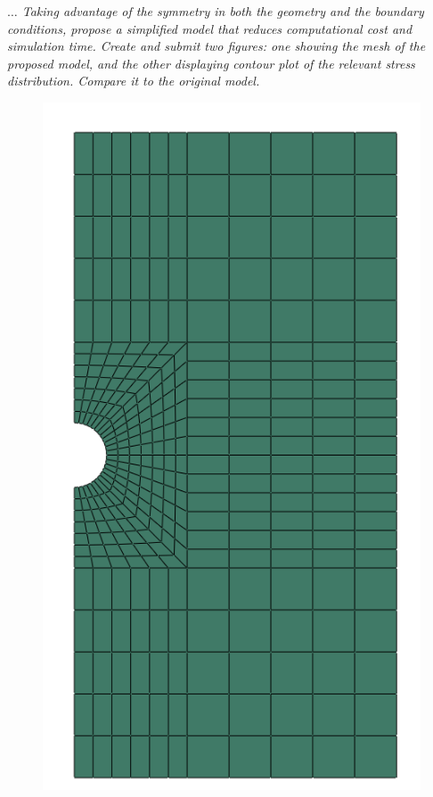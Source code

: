 \documentclass[12pt]{article}
\begin{document}
\vspace{1em}
\textit{$\dots$ Taking advantage of the symmetry in both the geometry and the boundary conditions, 
propose a simplified model that reduces computational cost and simulation time. 
Create and submit two figures: one showing the mesh of the proposed model, 
and the other displaying contour plot of the relevant stress distribution. 
Compare it to the original model.}

\begin{figure}[H]
    \centering
    \begin{minipage}{0.48\textwidth}
        \centering
        \includegraphics[width=\textwidth]{images/half_mesh.png}

\end{minipage}
\end{figure}
\end{document}
